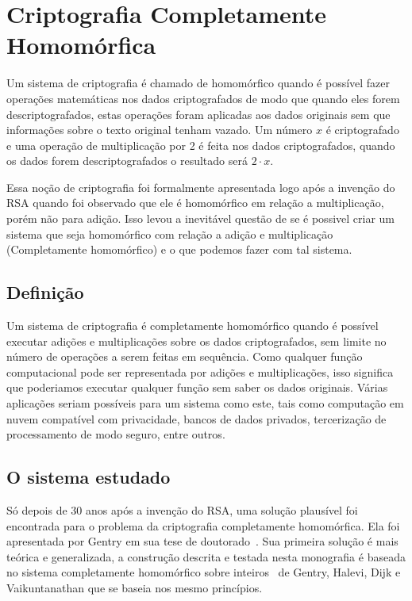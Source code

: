 \chapter{Criptografia Completamente Homomórfica}
\label{revisao}

Um sistema de criptografia é chamado de homomórfico quando é possível fazer operações matemáticas nos dados criptografados de modo que quando eles forem descriptografados, estas operações foram aplicadas aos dados originais sem que informações sobre o texto original tenham vazado.
Um número $x$ é criptografado e uma operação de multiplicação por 2 é feita nos dados criptografados, quando os dados forem descriptografados o resultado será $2 \cdot x$.

Essa noção de criptografia foi formalmente apresentada logo após a invenção do RSA quando foi observado que ele é homomórfico em relação a multiplicação, porém não para adição.
Isso levou a inevitável questão de se é possivel criar um sistema que seja homomórfico com relação a adição e multiplicação (Completamente homomórfico) e o que podemos fazer com tal sistema.

\section{Definição}
Um sistema de criptografia é completamente homomórfico quando é possível executar adições e multiplicações sobre os dados criptografados, sem limite no número de operações a serem feitas em sequência.
	Como qualquer função computacional pode ser representada por adições e multiplicações, isso significa que poderiamos executar qualquer função sem saber os dados originais. Várias aplicações seriam possíveis para um sistema como este, tais como computação em nuvem compatível com privacidade, bancos de dados privados, tercerização de processamento de modo seguro, entre outros.
	
\section{O sistema estudado}
Só depois de 30 anos após a invenção do RSA, uma solução plausível foi encontrada para o problema da criptografia completamente homomórfica. Ela foi apresentada por Gentry em sua tese de doutorado~\cite{gentrythesis}. Sua primeira solução é mais teórica e generalizada, a construção descrita e testada nesta monografia é baseada no sistema completamente homomórfico sobre inteiros~\cite{fheintegers} de Gentry, Halevi, Dijk e Vaikuntanathan que se baseia nos mesmo princípios.

